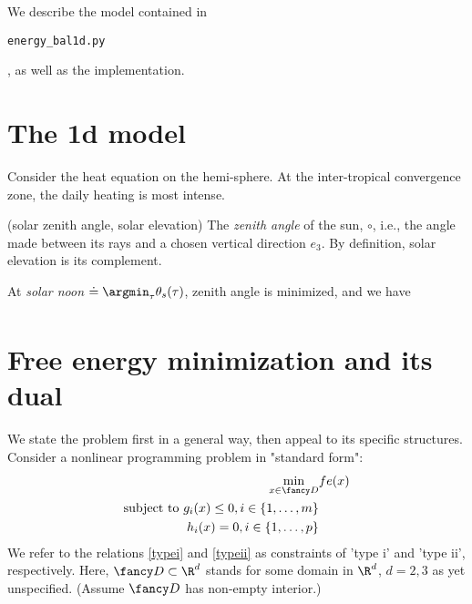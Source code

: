 
We describe the model contained in \begin{verbatim}
energy_bal1d.py\end{verbatim}, as well as the implementation. 

\section{The 1d model} 
	Consider the heat equation on the hemi-sphere. At the 
	inter-tropical convergence zone, the daily heating is most
	intense.  
	
	\begin{defn}{ (solar zenith angle, solar elevation) }
		The \emph{zenith angle} of the sun, $\circ$, i.e., the
		angle made between its rays and a chosen vertical 
		direction
		$e_3$. By definition, solar elevation is its complement.
		
		At \emph{solar noon} 
		$\doteq \argmin_\tau \theta_s(\tau)$,
		zenith angle is minimized, and we have
		\begin{align}
				
		\end{align}
	\end{defn}
	
\section{Free energy minimization and its dual}

We state the problem first in a general way, then appeal to its
specific structures. Consider a nonlinear programming problem
in "standard form":
\begin{align}
	\min_{x \in \fancy D} & fe(x)	\label{fe_min}	\\
	\text{subject to }	g_i(x) \leq 0, i \in \{ 1, \ldots, m \}	
						\label{typei}	\\
						h_i(x) = 0, i \in \{ 1, \ldots, p \}
						\label{typeii}
\end{align}
We refer to the relations \eqref{typei} and \eqref{typeii} as
constraints of 'type i' and 'type ii', respectively. Here, $\fancy
D \subset \R^d$ stands for some domain in $\R^d$, $d=2,3$ as yet
unspecified. (Assume $\fancy D$ has non-empty interior.)

